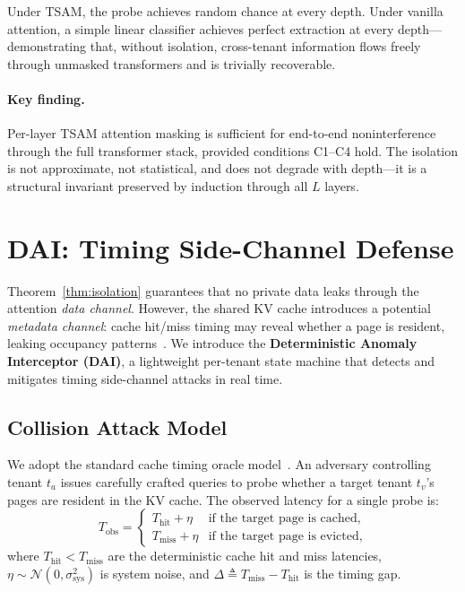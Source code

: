 \documentclass[11pt]{article}
\begin{document}
Under TSAM, the probe achieves random chance at every depth.  Under vanilla
attention, a simple linear classifier achieves perfect extraction at every
depth---demonstrating that, without isolation, cross-tenant information
flows freely through unmasked transformers and is trivially recoverable.

\paragraph{Key finding.}
Per-layer TSAM attention masking is sufficient for end-to-end noninterference
through the full transformer stack, provided conditions C1--C4 hold.  The
isolation is not approximate, not statistical, and does not degrade with
depth---it is a structural invariant preserved by induction through all
$L$ layers.


\section{DAI: Timing Side-Channel Defense}
\label{sec:dai}

Theorem~\ref{thm:isolation} guarantees that no private data leaks through the attention
\emph{data channel}. However, the shared KV cache introduces a potential \emph{metadata
channel}: cache hit/miss timing may reveal whether a page is resident, leaking occupancy
patterns~\cite{osvik2006cache, yarom2014flush, percival2005cache}. We introduce the
\textbf{Deterministic Anomaly Interceptor (DAI)}, a lightweight per-tenant state machine
that detects and mitigates timing side-channel attacks in real time.

\subsection{Collision Attack Model}
\label{sec:dai:attack}

We adopt the standard cache timing oracle model~\cite{osvik2006cache, percival2005cache}.
An adversary controlling tenant $t_a$ issues carefully crafted queries to probe whether
a target tenant $t_v$'s pages are resident in the KV cache. The observed latency for a
single probe is:
\begin{equation}
    T_{\mathrm{obs}} = \begin{cases}
        T_{\mathrm{hit}} + \eta & \text{if the target page is cached}, \\
        T_{\mathrm{miss}} + \eta & \text{if the target page is evicted},
    \end{cases}
    \label{eq:timing-oracle}
\end{equation}
where $T_{\mathrm{hit}} < T_{\mathrm{miss}}$ are the deterministic cache hit and miss
latencies, $\eta \sim \mathcal{N}(0, \sigma_{\mathrm{sys}}^2)$ is system noise, and
$\Delta \triangleq T_{\mathrm{miss}} - T_{\mathrm{hit}}$ is the timing gap.
\end{document}
